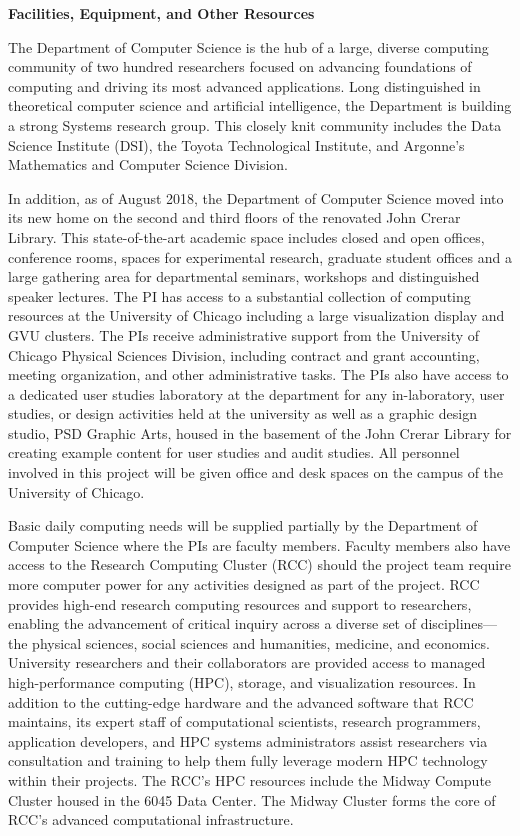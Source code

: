 \begin{center}
{\large \bf \TITLE}
\end{center}

\begin{center}
    {\bf Facilities, Equipment, and Other Resources}
\end{center}

The Department of Computer Science is the hub of a large, diverse computing
community of two hundred researchers focused on advancing foundations of
computing and driving its most advanced applications. Long distinguished in
theoretical computer science and artificial intelligence, the Department is
building a strong Systems research group. This closely knit community includes
the Data Science Institute (DSI), the Toyota Technological Institute, and
Argonne’s Mathematics and Computer Science Division.

In addition, as of August 2018, the Department of Computer Science moved into
its new home on the second and third floors of the renovated John Crerar
Library. This state-of-the-art academic space includes closed and open
offices, conference rooms, spaces for experimental research, graduate student
offices and a large gathering area for departmental seminars, workshops and
distinguished speaker lectures. The PI has access to a substantial collection
of computing resources at the University of Chicago including a large
visualization display and GVU clusters. The PIs receive administrative support
from the University of Chicago Physical Sciences Division, including contract
and grant accounting, meeting organization, and other administrative tasks.
The PIs also have access to a dedicated user studies laboratory at the
department for any in-laboratory, user studies, or design activities held at
the university as well as a graphic design studio, PSD Graphic Arts, housed in
the basement of the John Crerar Library for creating example content for user
studies and audit studies. All personnel involved in this project will be
given office and desk spaces on the campus of the University of Chicago.

Basic daily computing needs will be supplied partially by the Department of
Computer Science where the PIs are faculty members. Faculty members also have
access to the Research Computing Cluster (RCC) should the project team require
more computer power for any activities designed as part of the project. RCC
provides high-end research computing resources and support to researchers,
enabling the advancement of critical inquiry across a diverse set of
disciplines—the physical sciences, social sciences and humanities, medicine,
and economics. University researchers and their collaborators are provided
access to managed high-performance computing (HPC), storage, and visualization
resources. In addition to the cutting-edge hardware and the advanced software
that RCC maintains, its expert staff of computational scientists, research
programmers, application developers, and HPC systems administrators assist
researchers via consultation and training to help them fully leverage modern
HPC technology within their projects. The RCC’s HPC resources include the
Midway Compute Cluster housed in the 6045 Data Center. The Midway Cluster
forms the core of RCC’s advanced computational infrastructure.
